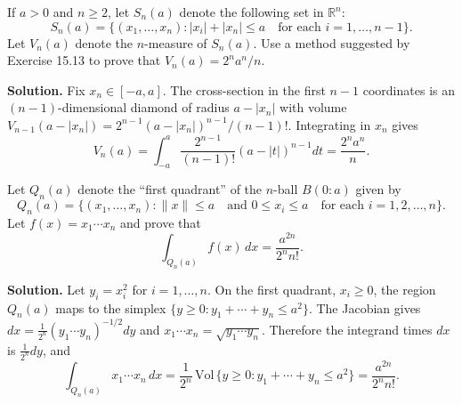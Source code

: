 \begin{problembox}
If \( a > 0 \) and \( n \geq 2 \), let \( S_n(a) \) denote the following set in \( \mathbb{R}^n \):
\[
S_n(a) = \{(x_1, \ldots, x_n): |x_i| + |x_n| \leq a \quad \text{for each } i = 1, \ldots, n - 1\}.
\]
Let \( V_n(a) \) denote the \( n \)-measure of \( S_n(a) \). Use a method suggested by Exercise 15.13 to prove that \( V_n(a) = 2^n a^n / n \).
\end{problembox}

\noindent\textbf{Solution.}
Fix \(x_n\in[-a,a]\). The cross-section in the first \(n-1\) coordinates is an \((n-1)\)-dimensional diamond of radius \(a-|x_n|\) with volume \(V_{n-1}(a-|x_n|)=2^{n-1}(a-|x_n|)^{n-1}/(n-1)!\). Integrating in \(x_n\) gives
\[
V_n(a)=\int_{-a}^{a} \frac{2^{n-1}}{(n-1)!} (a-|t|)^{n-1} dt = \frac{2^n a^n}{n}.
\]

\begin{problembox}
Let \( Q_n(a) \) denote the ``first quadrant'' of the \( n \)-ball \( B(0:a) \) given by
\[
Q_n(a) = \{(x_1, \ldots, x_n): \|x\| \leq a \quad \text{and } 0 \leq x_i \leq a \quad \text{for each } i = 1, 2, \ldots, n\}.
\]
Let \( f(x) = x_1 \cdots x_n \) and prove that
\[
\int_{Q_n(a)} f(x) \, dx = \frac{a^{2n}}{2^n n!}.
\]
\end{problembox}

\noindent\textbf{Solution.}
Let \(y_i=x_i^2\) for \(i=1,\ldots,n\). On the first quadrant, \(x_i\ge 0\), the region \(Q_n(a)\) maps to the simplex \(\{y\ge 0: y_1+\cdots+y_n\le a^2\}\). The Jacobian gives \(dx=\frac{1}{2^n}(y_1\cdots y_n)^{-1/2}dy\) and \(x_1\cdots x_n=\sqrt{y_1\cdots y_n}\). Therefore the integrand times \(dx\) is \(\frac{1}{2^n} dy\), and
\[
\int_{Q_n(a)} x_1\cdots x_n\,dx = \frac{1}{2^n}\,\mathrm{Vol}\,\{y\ge 0: y_1+\cdots+y_n\le a^2\} = \frac{a^{2n}}{2^n n!}.
\]